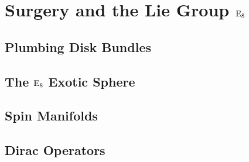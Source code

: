 \chapter{Surgery and the Lie Group \texorpdfstring{${\operatorname{E}}_8$}{E8}}

\section{Plumbing Disk Bundles}

\section{The \texorpdfstring{${\operatorname{E}}_8$}{E8} Exotic Sphere}

\section{Spin Manifolds}

\section{Dirac Operators}
